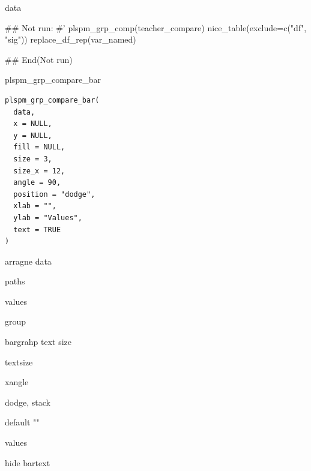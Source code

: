 \documentclass[a4paper]{book}
\begin{document}
%
\begin{Value}
data
\end{Value}
%
\begin{Examples}
\begin{ExampleCode}

## Not run: 
#'
plspm_grp_comp(teacher_compare) %
  nice_table(exclude=c("df", "sig"))%
  replace_df_rep(var_named) %

## End(Not run)

\end{ExampleCode}
\end{Examples}
%
\begin{Description}
plspm\_grp\_compare\_bar
\end{Description}
%
\begin{Usage}
\begin{verbatim}
plspm_grp_compare_bar(
  data,
  x = NULL,
  y = NULL,
  fill = NULL,
  size = 3,
  size_x = 12,
  angle = 90,
  position = "dodge",
  xlab = "",
  ylab = "Values",
  text = TRUE
)
\end{verbatim}
\end{Usage}
%
\begin{Arguments}
\begin{ldescription}
\item[\code{data}] arragne data

\item[\code{x}] paths

\item[\code{y}] values

\item[\code{fill}] group

\item[\code{size}] bargrahp text size

\item[\code{size\_x}] textsize

\item[\code{angle}] xangle

\item[\code{position}] dodge, stack

\item[\code{xlab}] default ""

\item[\code{ylab}] values

\item[\code{text}] hide bartext
\end{ldescription}
\end{Arguments}
\end{document}
